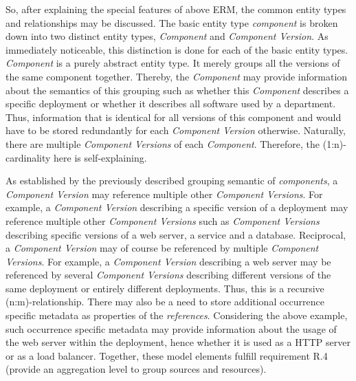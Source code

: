 So, after explaining the special features of above ERM, the common entity types and relationships may be discussed. The basic entity type \emph{component} is broken down into two distinct entity types, \emph{Component} and \emph{Component Version}. As immediately noticeable, this distinction is done for each of the basic entity types. \emph{Component} is a purely abstract entity type. It merely groups all the versions of the same component together. Thereby, the \emph{Component} may provide information about the semantics of this grouping such as whether this \emph{Component} describes a specific deployment or whether it describes all software used by a department. Thus, information that is identical for all versions of this component and would have to be stored redundantly for each \emph{Component Version} otherwise. Naturally, there are multiple \emph{Component Versions} of each \emph{Component}. Therefore, the (1:n)-cardinality here is self-explaining.\par 
As established by the previously described grouping semantic of \emph{components}, a \emph{Component Version} may reference multiple other \emph{Component Versions}. For example, a \emph{Component Version} describing a specific version of a deployment may reference multiple other \emph{Component Versions} such as \emph{Component Versions} describing specific versions of a web server, a service and a database. Reciprocal, a \emph{Component Version} may of course be referenced by multiple \emph{Component Versions}. For example, a \emph{Component Version} describing a web server may be referenced by several \emph{Component Versions} describing different versions of the same deployment or entirely different deployments. Thus, this is a recursive (n:m)-relationship. There may also be a need to store additional occurrence specific metadata as properties of the \emph{references}. Considering the above example, such occurrence specific metadata may provide information about the usage of the web server within the deployment, hence whether it is used as a HTTP server or as a load balancer. Together, these model elements fulfill requirement R.4 (provide an aggregation level to group sources and resources).\par
